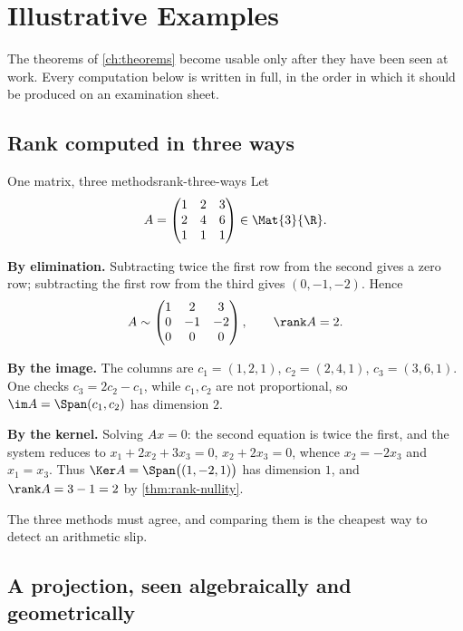 \chapter{Illustrative Examples}
\label{ch:examples}

The theorems of \cref{ch:theorems} become usable only after they have been seen
at work. Every computation below is written in full, in the order in which it
should be produced on an examination sheet.

\section{Rank computed in three ways}

\begin{example}{One matrix, three methods}{rank-three-ways}
Let
\[
  A=\begin{pmatrix} 1 & 2 & 3\\ 2 & 4 & 6\\ 1 & 1 & 1 \end{pmatrix}
  \in\Mat{3}{\R}.
\]

\textbf{By elimination.} Subtracting twice the first row from the second gives a
zero row; subtracting the first row from the third gives $(0,-1,-2)$. Hence
\[
  A\sim\begin{pmatrix} 1 & 2 & 3\\ 0 & -1 & -2\\ 0 & 0 & 0\end{pmatrix},
  \qquad \rank A=2 .
\]

\textbf{By the image.} The columns are $c_1=(1,2,1)$, $c_2=(2,4,1)$,
$c_3=(3,6,1)$. One checks $c_3=2c_2-c_1$, while $c_1,c_2$ are not proportional,
so $\im A=\Span(c_1,c_2)$ has dimension $2$.

\textbf{By the kernel.} Solving $Ax=0$: the second equation is twice the first,
and the system reduces to $x_1+2x_2+3x_3=0$, $x_2+2x_3=0$, whence
$x_2=-2x_3$ and $x_1=x_3$. Thus $\Ker A=\Span\bigl((1,-2,1)\bigr)$ has
dimension $1$, and $\rank A=3-1=2$ by \cref{thm:rank-nullity}.

The three methods must agree, and comparing them is the cheapest way to detect
an arithmetic slip.
\end{example}

\section{A projection, seen algebraically and geometrically}

